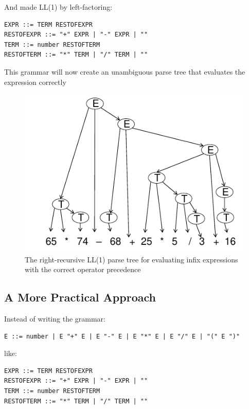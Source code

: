 \documentclass[
]{book}
\begin{document}
And made LL(1) by left-factoring:

\begin{verbatim}
EXPR ::= TERM RESTOFEXPR
RESTOFEXPR ::= "+" EXPR | "-" EXPR | ""
TERM ::= number RESTOFTERM
RESTOFTERM ::= "*" TERM | "/" TERM | ""
\end{verbatim}

This grammar will now create an unambiguous parse tree that evaluates the expression correctly

\begin{figure}
\includegraphics{img/09-image15} \caption{The right-recursive LL(1) parse tree for evaluating infix expressions with the correct operator precedence}\label{fig:infix-expression}
\end{figure}

\hypertarget{a-more-practical-approach}{%
\subsection{A More Practical Approach}\label{a-more-practical-approach}}

Instead of writing the grammar:

\begin{verbatim}
E ::= number | E "+" E | E "-" E | E "*" E | E "/" E | "(" E ")"
\end{verbatim}

like:

\begin{verbatim}
EXPR ::= TERM RESTOFEXPR
RESTOFEXPR ::= "+" EXPR | "-" EXPR | ""
TERM ::= number RESTOFTERM
RESTOFTERM ::= "*" TERM | "/" TERM | ""
\end{verbatim}
\end{document}
